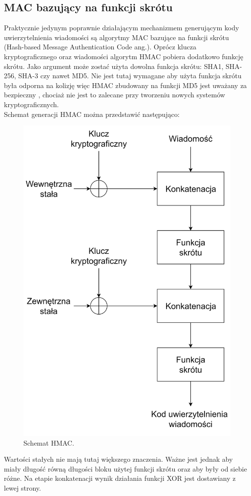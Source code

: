 \subsection{MAC bazujący na funkcji skrótu}
Praktycznie jedynym poprawnie działającym mechanizmem generującym kody uwierzytelnienia wiadomości są algorytmy
MAC bazujące na funkcji skrótu (Hash-based Message Authentication Code ang.). 
Oprócz klucza kryptograficznego oraz wiadomości algorytm HMAC pobiera dodatkowo funkcję skrótu. 
Jako argument może zostać użyta dowolna funkcja skrótu: SHA1, SHA-256, SHA-3 czy nawet MD5. 
Nie jest tutaj wymagane aby użyta funkcja skrótu była odporna na kolizję więc HMAC zbudowany na
funkcji MD5 jest uważany za bezpieczny \cite{hmacmd5}, chociaż nie jest to zalecane przy tworzeniu nowych systemów kryptograficznych. \\
Schemat generacji HMAC można przedstawić następująco:
\begin{figure}[t]
    \centering
	\includegraphics[width=\textwidth, height=\textheight/2, keepaspectratio]{content/images/hmac}
    \caption{Schemat HMAC.}
\end{figure} 
\noindent
Wartości stałych nie mają tutaj większego znaczenia. Ważne jest jednak aby miały długość równą długości bloku
użytej funkcji skrótu oraz aby były od siebie różne. 
Na etapie konkatenacji wynik działania funkcji XOR jest dostawiany z lewej strony.

